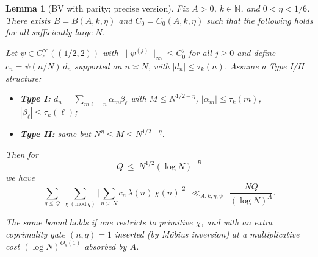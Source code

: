 \documentclass[11pt]{article}
\newtheorem{lemma}{Lemma}[section]
\theoremstyle{definition}
\theoremstyle{remark}
\begin{document}
\begin{lemma}[BV with parity; precise version]\label{lem:BV-parity-precise}
Fix $A>0$, $k\in\mathbb N$, and $0<\eta<1/6$. There exists $B=B(A,k,\eta)$ and $C_0=C_0(A,k,\eta)$ such that the following holds for all sufficiently large $N$.

Let $\psi\in C_c^\infty((1/2,2))$ with $\|\psi^{(j)}\|_\infty\le C_0^{j}$ for all $j\ge 0$ and define $c_n = \psi(n/N)\,d_n$ supported on $n\asymp N$, with $|d_n|\le \tau_k(n)$. Assume a Type I/II structure:

\begin{itemize}
  \item \textbf{Type I:} $d_n=\sum_{m\ell=n}\alpha_m\beta_\ell$ with $M\le N^{1/2-\eta}$, $|\alpha_m|\le \tau_k(m)$, $|\beta_\ell|\le \tau_k(\ell)$;
  \item \textbf{Type II:} same but $N^{\eta}\le M\le N^{1/2-\eta}$.
\end{itemize}

Then for
\[
Q\ \le\ N^{1/2}(\log N)^{-B}
\]
we have
\[
\sum_{q\le Q}\ \sum_{\chi\ (\mathrm{mod}\ q)}\Bigg|\sum_{n\asymp N} c_n\,\lambda(n)\,\chi(n)\Bigg|^2\ \ \ll_{A,k,\eta,\psi}\ \ \frac{NQ}{(\log N)^A}.
\]

The same bound holds if one restricts to primitive $\chi$, and with an extra coprimality gate $(n,q)=1$ inserted (by Möbius inversion) at a multiplicative cost $(\log N)^{O_{k}(1)}$ absorbed by $A$.
\end{lemma}
\end{document}
